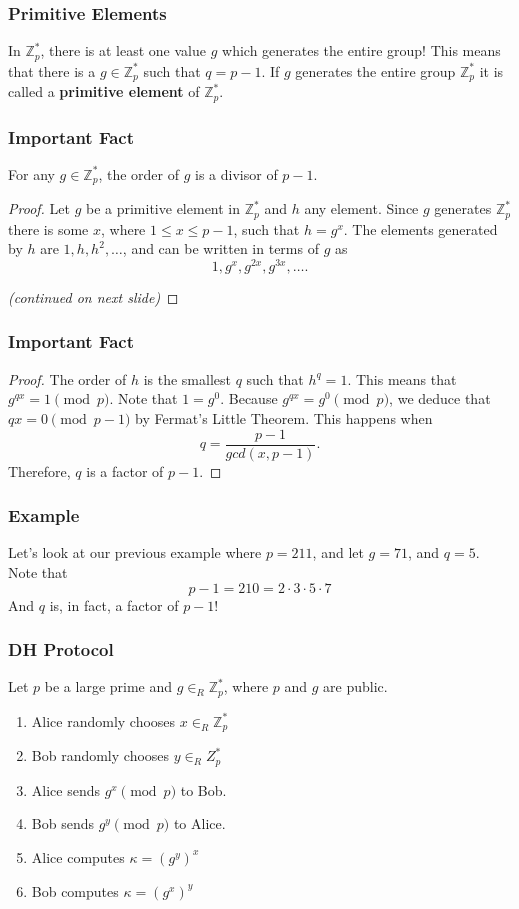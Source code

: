 \documentclass{beamer}
\newcommand{\<}{\langle}
\renewcommand{\>}{\rangle}
\newcommand{\Z}{\mathbb{Z}}
\begin{document}
\begin{frame}
\frametitle{Primitive Elements}

In $\Z_p^*$, there is at least one value $g$ which generates the entire group! This means that there is a $g\in\Z_p^*$ such that $q = p-1$. If $g$ generates the entire group $\Z_p^*$ it is called a \textbf{primitive element} of $\Z_p^*$. 
\end{frame}

\begin{frame}
\frametitle{Important Fact}

\begin{theorem}
For any $g\in\Z_p^*$, the order of $g$ is a divisor of $p-1$. 
\end{theorem}\pause
\begin{proof}
Let $g$ be a primitive element in $\Z_p^*$ and $h$ any element. Since $g$ generates $\Z_p^*$ there is some $x$, where $1\le x \le p-1$, such that $h = g^x$. The elements generated by $h$ are $1, h, h^2, \dots$, and can be written in terms of $g$ as
\[
1, g^x, g^{2x}, g^{3x},\dots.
\]

\emph{(continued on next slide)}
\end{proof}
\end{frame}

\begin{frame}
\frametitle{Important Fact}
\begin{proof}
The order of $h$ is the smallest $q$ such that $h^q = 1$. This means that $g^{qx} = 1 \pmod p$. Note that $1 = g^0$. Because $g^{qx} = g^0 \pmod p$, we deduce that $qx = 0 \pmod{p-1}$ by Fermat's Little Theorem. This happens when
\[
q = \frac{p-1}{gcd(x,p-1)}.
\]
Therefore, $q$ is a factor of $p-1$. 
\end{proof}
\end{frame}


\begin{frame}
\frametitle{Example}

Let's look at our previous example where $p=211$, and let $g = 71$, and $q=5$. Note that 
\[
p-1 = 210 = 2\cdot 3\cdot 5 \cdot 7
\]
And $q$ is, in fact, a factor of $p-1$!
\end{frame}


\begin{frame}
\frametitle{DH Protocol}

Let $p$ be a large prime and $g\in_R \Z_p^*$, where $p$ and $g$ are public. 
\begin{enumerate}[1)]
\item Alice randomly chooses $x\in_R\Z_p^*$
\item Bob randomly chooses $y\in_RZ_p^*$
\item Alice sends $g^x\pmod p$ to Bob.
\item Bob sends $g^y\pmod p$ to Alice.
\pause
\item Alice computes $\kappa = (g^y)^x$
\item Bob computes $\kappa = (g^x)^y$
\end{enumerate}
\end{frame}
\end{document}
